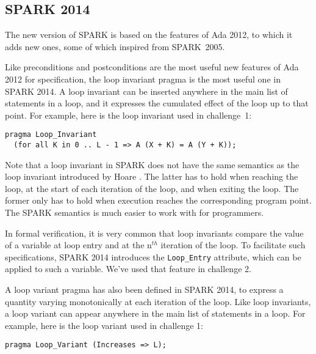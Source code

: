 \documentclass[sttt,draft]{svjour}
\newcommand{\oldspark}{SPARK~2005\xspace}
\begin{document}
\subsection{SPARK 2014}

The new version of SPARK is based on the features of Ada 2012, to which it adds
new ones, some of which inspired from \oldspark.

Like preconditions and postconditions are the most useful new features of Ada
2012 for specification, the loop invariant pragma is the most useful one in
SPARK 2014. A loop invariant can be inserted anywhere in the main list of
statements in a loop, and it expresses the cumulated effect of the loop up to
that point. For example, here is the loop invariant used in challenge~1:

\begin{footnotesize}
\begin{verbatim}
pragma Loop_Invariant
  (for all K in 0 .. L - 1 => A (X + K) = A (Y + K));
\end{verbatim}
\end{footnotesize}

Note that a loop invariant in SPARK does not have the same semantics as the
loop invariant introduced by Hoare \cite{hoare69cacm}. The latter has to hold
when reaching the loop, at the start of each iteration of the loop, and when
exiting the loop. The former only has to hold when execution reaches the
corresponding program point. The SPARK semantics is much easier to work with
for programmers.

In formal verification, it is very common that loop invariants compare the
value of a variable at loop entry and at the n$^{th}$ iteration of the loop. To
facilitate such specifications, SPARK 2014 introduces the \verb|Loop_Entry|
attribute, which can be applied to such a variable. We've used that feature in
challenge 2.

A loop variant pragma has also been defined in SPARK 2014, to express a
quantity varying monotonically at each iteration of the loop. Like loop
invariants, a loop variant can appear anywhere in the main list of statements
in a loop. For example, here is the loop variant used in challenge 1:

\begin{footnotesize}
\begin{verbatim}
pragma Loop_Variant (Increases => L);
\end{verbatim}
\end{footnotesize}
\end{document}
